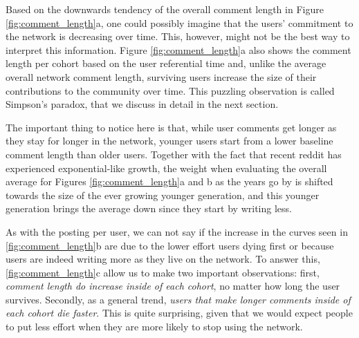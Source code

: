 
Based on the downwards tendency of the overall comment length in Figure \ref{fig:comment_length}a, one could possibly imagine that the users' commitment to the network is decreasing over time. This, however, might not be the best way to interpret this information. Figure \ref{fig:comment_length}a also shows the comment length per cohort based on the user referential time and, unlike the average overall network comment length, surviving users increase the size of their contributions to the community over time. This puzzling observation is called Simpson's paradox, that we discuss in detail in the next section.

The important thing to notice here is that, while user comments get longer as they stay for longer in the network, younger users start from a lower baseline comment length than older users. Together with the fact that recent reddit has experienced exponential-like growth, the weight when evaluating the overall average for Figures \ref{fig:comment_length}a and b as the years go by is shifted towards the size of the ever growing younger generation, and this younger generation brings the average down since they start by writing less.

As with the posting per user, we can not say if the increase in the curves seen in \ref{fig:comment_length}b are due to the lower effort users dying first or because users are indeed writing more as they live on the network. To answer this, \ref{fig:comment_length}c allow us to make two important observations: first, \textit{comment length do increase inside of each cohort}, no matter how long the user survives. Secondly, as a general trend, \textit{users that make longer comments inside of each cohort die faster}. This is quite surprising, given that we would expect people to put less effort when they are more likely to stop using the network.

